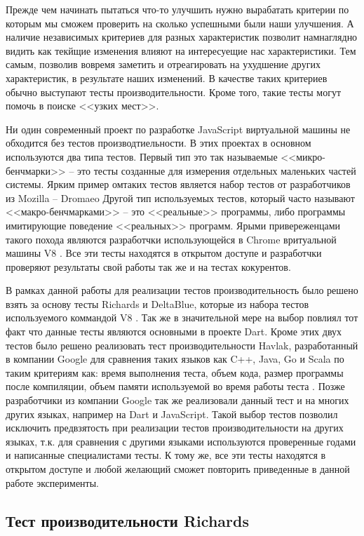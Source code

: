 Прежде чем начинать пытаться что-то улучшить нужно вырабатать критерии по которым мы сможем проверить на сколько успешными были наши улучшения. А наличие независимых критериев для разных характеристик позволит намнаглядно видить как текйщие изменения влияют на интересуещие нас характеристики. Тем самым, позволив вовремя заметить и отреагировать на ухудшение других характеристик, в результате наших изменений.
В качестве таких критериев обычно выступают тесты производительности. Кроме того, такие тесты могут помочь в поиске <<узких мест>>.

Ни один современный проект по разработке JavaScript виртуальной машины не обходится без тестов производтиельности. В этих проектах в основном используются два типа тестов. Первый тип это так называемые <<микро-бенчмарки>> -- это тесты созданные для измерения отдельных маленьких частей системы. Ярким пример омтаких тестов является набор тестов от разработчиков из Mozilla -- Dromaeo \cite{Dromaeo}  Другой тип используемых тестов, который часто называют <<макро-бенчмарками>> -- это <<реальные>> программы, либо программы имитирующие поведение <<реальных>> программ. Ярыми привереженцами такого похода являются разработчки использующейся в Chrome вритуальной машины V8 \cite{V8:Benchmarks, Octane}. Все эти тесты находятся в открытом доступе и разработчки проверяют результаты свой работы так же и на тестах кокурентов.

В рамках данной работы для реализации тестов производительность было решено взять за основу тесты Richards и DeltaBlue, которые из набора тестов используемого коммандой V8 \cite{V8:Benchmarks}. Так же в значительной мере на выбор повлиял тот факт что данные тесты являются основными в проекте Dart.
Кроме этих двух тестов было решено реализовать тест производительности Havlak, разработанный в компании Google для сравнения таких языков как C++, Java, Go и Scala по таким критериям как: время выполнения теста, объем кода, размер программы после компиляции, объем памяти используемой во время работы теста \cite{HavlakBench}. Позже разработчики из компании Google так же реализовали данный тест и на многих других языках, например на Dart и JavaScript.
Такой выбор тестов позволил исключить предвзятость при реализации тестов производительности на других языках, т.к. для сравнения с другими языками используются проверенные годами и написанные специалистами тесты. К тому же, все эти тесты находятся в открытом доступе и любой желающий сможет повторить приведенные в данной работе эксперименты.

\subsection{Тест производительности Richards}


